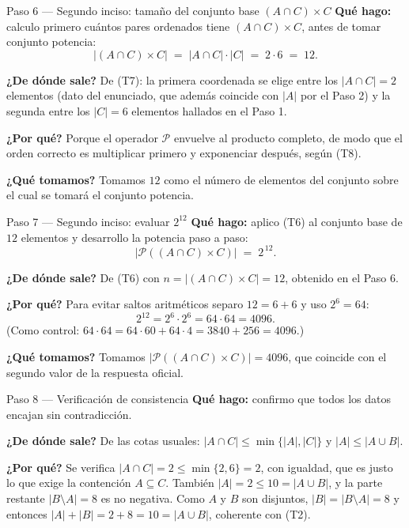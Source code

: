 \documentclass[11pt]{article}
\begin{document}
\begin{sol}
\begin{paso}{Paso 6 --- Segundo inciso: tamaño del conjunto base $(A\cap C)\times C$}
\textbf{Qué hago:} calculo primero cuántos pares ordenados tiene $(A\cap C)\times C$, antes de tomar conjunto potencia:
\[
|(A\cap C)\times C| \;=\; |A\cap C|\cdot |C| \;=\; 2\cdot 6 \;=\; 12 .
\]

\textbf{¿De dónde sale?} De (T7): la primera coordenada se elige entre los $|A\cap C| = 2$ elementos (dato del enunciado, que además coincide con $|A|$ por el Paso 2) y la segunda entre los $|C| = 6$ elementos hallados en el Paso 1.

\textbf{¿Por qué?} Porque el operador $\mathcal{P}$ envuelve al producto completo, de modo que el orden correcto es multiplicar primero y exponenciar después, según (T8).

\textbf{¿Qué tomamos?} Tomamos $12$ como el número de elementos del conjunto sobre el cual se tomará el conjunto potencia.
\end{paso}

\begin{paso}{Paso 7 --- Segundo inciso: evaluar $2^{12}$}
\textbf{Qué hago:} aplico (T6) al conjunto base de $12$ elementos y desarrollo la potencia paso a paso:
\[
|\mathcal{P}((A\cap C)\times C)| \;=\; 2^{\,12}.
\]

\textbf{¿De dónde sale?} De (T6) con $n = |(A\cap C)\times C| = 12$, obtenido en el Paso 6.

\textbf{¿Por qué?} Para evitar saltos aritméticos separo $12 = 6+6$ y uso $2^{6} = 64$:
\[
2^{12} = 2^{6}\cdot 2^{6} = 64\cdot 64 = 4096 .
\]
(Como control: $64\cdot 64 = 64\cdot 60 + 64\cdot 4 = 3840 + 256 = 4096$.)

\textbf{¿Qué tomamos?} Tomamos $|\mathcal{P}((A\cap C)\times C)| = 4096$, que coincide con el segundo valor de la respuesta oficial.
\end{paso}

\begin{paso}{Paso 8 --- Verificación de consistencia}
\textbf{Qué hago:} confirmo que todos los datos encajan sin contradicción.

\textbf{¿De dónde sale?} De las cotas usuales: $|A\cap C| \le \min\{|A|,|C|\}$ y $|A| \le |A\cup B|$.

\textbf{¿Por qué?} Se verifica $|A\cap C| = 2 \le \min\{2, 6\} = 2$, con igualdad, que es justo lo que exige la contención $A\subseteq C$. También $|A| = 2 \le 10 = |A\cup B|$, y la parte restante $|B\setminus A| = 8$ es no negativa. Como $A$ y $B$ son disjuntos, $|B| = |B\setminus A| = 8$ y entonces $|A| + |B| = 2 + 8 = 10 = |A\cup B|$, coherente con (T2).
\end{paso}

\end{sol}
\end{document}
